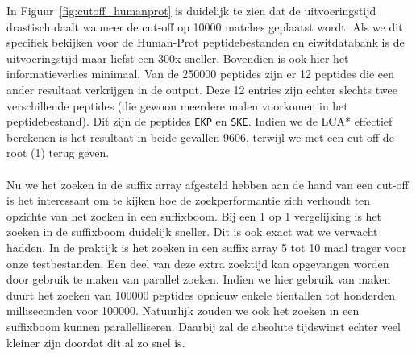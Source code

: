 In Figuur~\ref{fig:cutoff_humanprot} is duidelijk te zien dat de uitvoeringstijd drastisch daalt wanneer de cut-off op 10000 matches geplaatst wordt.
Als we dit specifiek bekijken voor de Human-Prot peptidebestanden en eiwitdatabank is de uitvoeringstijd maar liefst een 300x sneller.
Bovendien is ook hier het informatieverlies minimaal.
Van de 250000 peptides zijn er 12 peptides die een ander resultaat verkrijgen in de output.
Deze 12 entries zijn echter slechts twee verschillende peptides (die gewoon meerdere malen voorkomen in het peptidebestand).
Dit zijn de peptides \texttt{EKP} en \texttt{SKE}.
Indien we de LCA* effectief berekenen is het resultaat in beide gevallen 9606, terwijl we met een cut-off de root (1) terug geven.
\\ \\
Nu we het zoeken in de suffix array afgesteld hebben aan de hand van een cut-off is het interessant om te kijken hoe de zoekperformantie zich verhoudt ten opzichte van het zoeken in een suffixboom.
Bij een 1 op 1 vergelijking is het zoeken in de suffixboom duidelijk sneller.
Dit is ook exact wat we verwacht hadden.
In de praktijk is het zoeken in een suffix array 5 tot 10 maal trager voor onze testbestanden.
Een deel van deze extra zoektijd kan opgevangen worden door gebruik te maken van parallel zoeken.
Indien we hier gebruik van maken duurt het zoeken van 100000 peptides opnieuw enkele tientallen tot honderden milliseconden voor 100000.
Natuurlijk zouden we ook het zoeken in een suffixboom kunnen parallelliseren.
Daarbij zal de absolute tijdswinst echter veel kleiner zijn doordat dit al zo snel is.

